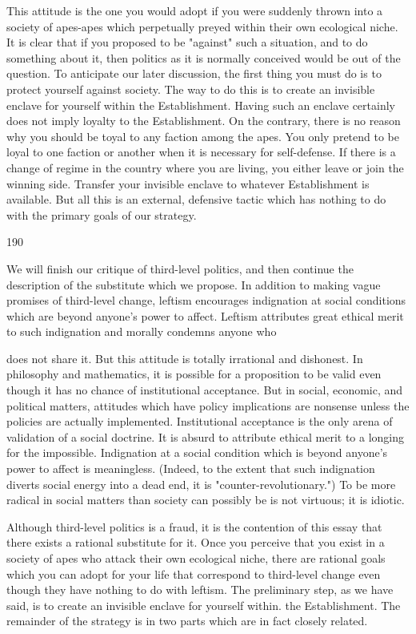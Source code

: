 \documentclass[10pt,twoside]{memoir}
\begin{document}
\begin{enumerate}
{\begin{enumerate}
\begin{sysrules}
\begin{sysrules}
\begin{sysrules}
\begin{sysrules}
{\begin{enumerate}
{{{{{{{{{This attitude is the one you would adopt if you were suddenly thrown 
into a society of apes-apes which perpetually preyed within their own 
ecological niche. It is clear that if you proposed to be "against" such a 
situation, and to do something about it, then politics as it is normally 
conceived would be out of the question. To anticipate our later discussion, 
the first thing you must do is to protect yourself against society. The way to 
do this is to create an invisible enclave for yourself within the Establishment. 
Having such an enclave certainly does not imply loyalty to the 
Establishment. On the contrary, there is no reason why you should be toyal 
to any faction among the apes. You only pretend to be loyal to one faction 
or another when it is necessary for self-defense. If there is a change of regime 
in the country where you are living, you either leave or join the winning side. 
Transfer your invisible enclave to whatever Establishment is available. But all 
this is an external, defensive tactic which has nothing to do with the primary 
goals of our strategy. 


190 


We will finish our critique of third-level politics, and then continue the 
description of the substitute which we propose. In addition to making vague 
promises of third-level change, leftism encourages indignation at social 
conditions which are beyond anyone's power to affect. Leftism attributes 
great ethical merit to such indignation and morally condemns anyone who 


does not share it. But this attitude is totally irrational and dishonest. In 
philosophy and mathematics, it is possible for a proposition to be valid even 
though it has no chance of institutional acceptance. But in social, economic, 
and political matters, attitudes which have policy implications are nonsense 
unless the policies are actually implemented. Institutional acceptance is the 
only arena of validation of a social doctrine. It is absurd to attribute ethical 
merit to a longing for the impossible. Indignation at a social condition which 
is beyond anyone's power to affect is meaningless. (Indeed, to the extent 
that such indignation diverts social energy into a dead end, it is 
"counter-revolutionary.") To be more radical in social matters than society 
can possibly be is not virtuous; it is idiotic. 

Although third-level politics is a fraud, it is the contention of this essay 
that there exists a rational substitute for it. Once you perceive that you exist 
in a society of apes who attack their own ecological niche, there are rational 
goals which you can adopt for your life that correspond to third-level change 
even though they have nothing to do with leftism. The preliminary step, as 
we have said, is to create an invisible enclave for yourself within. the 
Establishment. The remainder of the strategy is in two parts which are in 
fact closely related. 

}}}}}}}}}
\end{enumerate}}
\end{sysrules}
\end{sysrules}
\end{sysrules}
\end{sysrules}
\end{enumerate}}
\end{enumerate}
\end{document}
